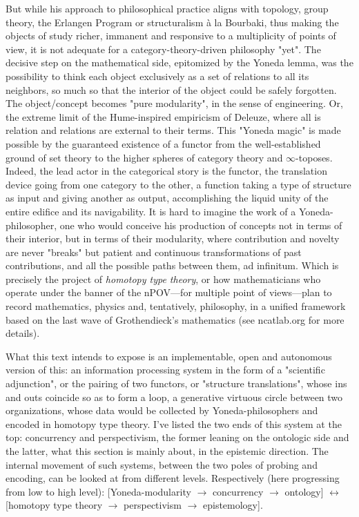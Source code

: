 \documentclass[11pt]{article}
\begin{document}
But while his approach to philosophical practice aligns with topology, group theory, the
Erlangen Program or structuralism à la Bourbaki, thus making the objects of study
richer, immanent and responsive to a multiplicity of points of view, it is not adequate
for a category-theory-driven philosophy "yet". The decisive step on the mathematical
side, epitomized by the Yoneda lemma, was the possibility to think each object
exclusively as a set of relations to all its neighbors, so much so that the interior of
the object could be safely forgotten. The object/concept becomes "pure modularity", in
the sense of engineering. Or, the extreme limit of the Hume-inspired empiricism of
Deleuze, where all is relation and relations are external to their terms. This "Yoneda
magic" is made possible by the guaranteed existence of a functor from the
well-established ground of set theory to the higher spheres of category theory and
\(\infty\)-toposes. Indeed, the lead actor in the categorical story is the functor, the
translation device going from one category to the other, a function taking a type of
structure as input and giving another as output, accomplishing the liquid unity of the
entire edifice and its navigability. It is hard to imagine the work of a
Yoneda-philosopher, one who would conceive his production of concepts not in terms of
their interior, but in terms of their modularity, where contribution and novelty are
never "breaks" but patient and continuous transformations of past contributions, and all
the possible paths between them, ad infinitum. Which is precisely the project of
\emph{homotopy type theory}, or how mathematicians who operate under the banner of the
nPOV---for multiple point of views---plan to record mathematics, physics and,
tentatively, philosophy, in a unified framework based on the last wave of Grothendieck's
mathematics (see ncatlab.org for more details).

What this text intends to expose is an implementable, open and autonomous version of
this: an information processing system in the form of a "scientific adjunction", or the
pairing of two functors, or "structure translations", whose ins and outs coincide so as
to form a loop, a generative virtuous circle between two organizations, whose data would
be collected by Yoneda-philosophers and encoded in homotopy type theory. I've listed the
two ends of this system at the top: concurrency and perspectivism, the former leaning on
the ontologic side and the latter, what this section is mainly about, in the epistemic
direction. The internal movement of such systems, between the two poles of probing and
encoding, can be looked at from different levels. Respectively (here progressing from
low to high level): [Yoneda-modularity \(\to\) concurrency \(\to\) ontology]
\(\leftrightarrow\) [homotopy type theory \(\to\) perspectivism \(\to\) epistemology].
\end{document}
